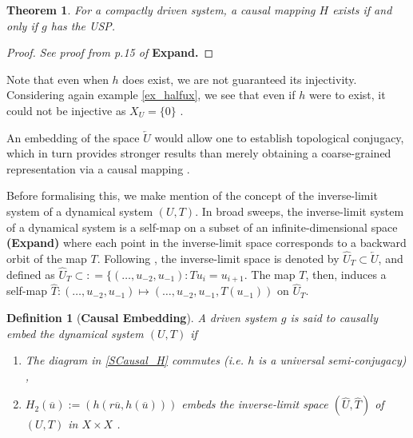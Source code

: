 \documentclass[a4paper,12pt,twoside]{book}
\newtheorem{Definition}{Definition}[]
\newtheorem{Theorem}{Theorem}[]
\begin{document}
\begin{Theorem}
  For a compactly driven system, a causal mapping $H$ exists if and only if $g$ has the USP. 
\end{Theorem}
\begin{proof}
  \emph{See proof from p.15 of \cite{manjunath2021universal}}
  \textbf{Expand.}
\end{proof}

Note that even when $h$ does exist, we are not guaranteed its injectivity. Considering again example \ref{ex_halfux}, we see that even if $h$ were to exist, it could not be injective as $X_U=\{0\}$ . 

An embedding of the space $\overleftarrow{U}$    would allow one to establish topological conjugacy, which in turn provides stronger results than merely obtaining a coarse-grained representation via a causal mapping \cite{M: I feel this is very confusing to the reader as the co-domain of causal mapping is the left-infinite space and , so please omit if possible. You can just say we want to restrict inputs to the left-infinite orbits of a dynamical system and then explore conjugacy instead of a mere semi-conjugacy}. 


Before formalising this, we make mention of the concept of the inverse-limit system of a dynamical system $(U,T)$. 
  In broad sweeps, the inverse-limit system of a dynamical system is a self-map on a subset of an infinite-dimensional space \textbf{(Expand)} where each point in the inverse-limit space corresponds to a backward orbit of the map $T$. Following \cite{manjunath2021universal}, the inverse-limit space is denoted by $\widehat{U}_T\subset \overleftarrow{U}$, and defined as $\widehat{U}_T\subset: = \{ (\ldots,u_{-2},u_{-1}): Tu_{i} = u_{i+1}$. 
  The map $T$, then, induces a self-map $\widehat{T}: (\ldots,u_{-2},u_{-1}) \mapsto  (\ldots,u_{-2},u_{-1},T(u_{-1}))$ on $\widehat{U}_T$.

\begin{Definition}
  [\bf Causal Embedding]\label{Dfn_CausalEmbed}
  A driven system $g$ is said to causally embed the dynamical system $(U,T)$ if 
  \vspace{-8mm}
\begin{enumerate}[noitemsep, label=\roman*.]
  \item The diagram in \ref{SCausal_H} commutes (i.e. $h$ is a universal semi-conjugacy) ,
  \item $H_2(\overline{u}):=(h(r\overline{u}, h(\overline{u})))$ embeds the inverse-limit space $(\widehat{U}, \hat{T})$ of $(U,T)$ in $X\times{X}$ .
\end{enumerate}
\end{Definition}
\end{document}
